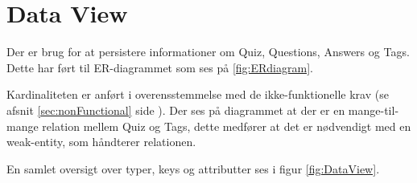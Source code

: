 \section{Data View}

Der er brug for at persistere informationer om Quiz, Questions, Answers og Tags. Dette har ført til ER-diagrammet som ses på \ref{fig:ERdiagram}. 

Kardinaliteten er anført i overensstemmelse med de ikke-funktionelle krav (se afsnit \ref{sec:nonFunctional} side \pageref{sec:nonFunctional}).
Der ses på diagrammet at der er en mange-til-mange relation mellem Quiz og Tags, dette medfører at det er nødvendigt med en weak-entity, som håndterer relationen.


En samlet oversigt over typer, keys og attributter ses i figur \ref{fig:DataView}.



